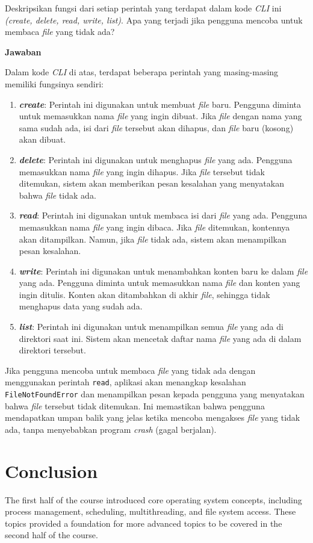 \documentclass[12pt]{article}
\begin{document}
Deskripsikan fungsi dari setiap perintah yang terdapat dalam kode \textit{CLI} ini \textit{(create, delete, read, write, list)}. Apa yang terjadi jika pengguna mencoba untuk membaca \textit{file} yang tidak ada?

\textbf{Jawaban}

Dalam kode \textit{CLI} di atas, terdapat beberapa perintah yang masing-masing memiliki fungsinya sendiri:

\begin{enumerate}
    \item \textbf{\textit{create}}: Perintah ini digunakan untuk membuat \textit{file} baru. Pengguna diminta untuk memasukkan nama \textit{file} yang ingin dibuat. Jika \textit{file} dengan nama yang sama sudah ada, isi dari \textit{file} tersebut akan dihapus, dan \textit{file} baru (kosong) akan dibuat.
    
    \item \textbf{\textit{delete}}: Perintah ini digunakan untuk menghapus \textit{file} yang ada. Pengguna memasukkan nama \textit{file} yang ingin dihapus. Jika \textit{file} tersebut tidak ditemukan, sistem akan memberikan pesan kesalahan yang menyatakan bahwa \textit{file} tidak ada.
    
    \item \textbf{\textit{read}}: Perintah ini digunakan untuk membaca isi dari \textit{file} yang ada. Pengguna memasukkan nama \textit{file} yang ingin dibaca. Jika \textit{file} ditemukan, kontennya akan ditampilkan. Namun, jika \textit{file} tidak ada, sistem akan menampilkan pesan kesalahan.
    
    \item \textbf{\textit{write}}: Perintah ini digunakan untuk menambahkan konten baru ke dalam \textit{file} yang ada. Pengguna diminta untuk memasukkan nama \textit{file} dan konten yang ingin ditulis. Konten akan ditambahkan di akhir \textit{file}, sehingga tidak menghapus data yang sudah ada.
    
    \item \textbf{\textit{list}}: Perintah ini digunakan untuk menampilkan semua \textit{file} yang ada di direktori saat ini. Sistem akan mencetak daftar nama \textit{file} yang ada di dalam direktori tersebut.
\end{enumerate}

Jika pengguna mencoba untuk membaca \textit{file} yang tidak ada dengan menggunakan perintah \texttt{read}, aplikasi akan menangkap kesalahan \texttt{FileNotFoundError} dan menampilkan pesan kepada pengguna yang menyatakan bahwa \textit{file} tersebut tidak ditemukan. Ini memastikan bahwa pengguna mendapatkan umpan balik yang jelas ketika mencoba mengakses \textit{file} yang tidak ada, tanpa menyebabkan program \textit{crash} (gagal berjalan).

\section{Conclusion}
The first half of the course introduced core operating system concepts, including process management, scheduling, multithreading, and file system access. These topics provided a foundation for more advanced topics to be covered in the second half of the course.
\end{document}
